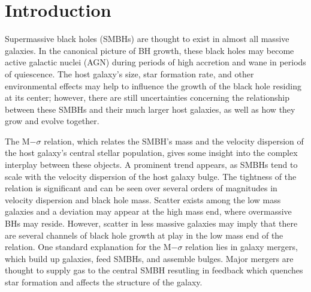 \documentclass[manuscript]{aastex}
\begin{document}

\section{Introduction}\label{sec-intro}



Supermassive black holes (SMBHs) are thought to exist in almost all massive galaxies. \citep{Kormendy2013} In the canonical picture of BH growth, these black holes may become active galactic nuclei (AGN) during periods of high accretion and wane in periods of quiescence. \citep{Alexander2005,Papovich2006,Volonteri2012} The host galaxy's size, star formation rate, and other environmental effects may help to influence the growth of the black hole residing at its center; however, there are still uncertainties concerning the relationship between these SMBHs and their much larger host galaxies, as well as how they grow and evolve together. \citep[5-8 citations here]{Haehnelt2000,DiMatteo2005,Hopkins2006,Fu2008,Sijacki2009,Silverman2009,Mullaney2012}

The M$-\sigma$ relation, which relates the SMBH's mass and the velocity dispersion of the host galaxy's central stellar population, gives some insight into the complex interplay between these objects. \citep{Ferrarese2000} A prominent trend appears, as SMBHs tend to scale with the velocity dispersion of the host galaxy bulge. %
The tightness of the relation is significant and can be seen over several orders of magnitudes in velocity dispersion and black hole mass. \citep{Merritt2001,Graham2011,Mcconnell2013,Kormendy2013} Scatter exists among the low mass galaxies and a deviation may appear at the high mass end, where overmassive BHs may reside. \citep{VanDenBosch2007,Moster2010,Natarajan2011} However, scatter in less massive galaxies may imply that there are several channels of black hole growth at play in the low mass end of the relation. \citep{Micic2007,Volonteri2009,Reines2013,Graham2014} One standard explanation for the M$-\sigma$ relation lies in galaxy mergers, which build up galaxies, feed SMBHs, and assemble bulges. \citep{DiMatteo2005,Shen2008} Major mergers are thought to supply gas to the central SMBH resutling in feedback which quenches star formation and affects the structure of the galaxy. 
\end{document}

